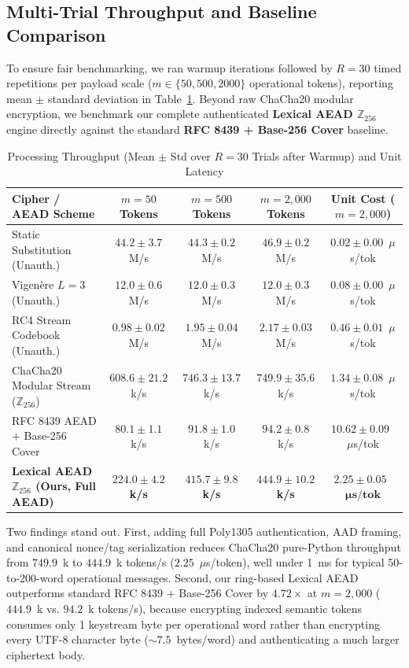 \documentclass[conference]{IEEEtran}
\begin{document}
\subsection{Multi-Trial Throughput and Baseline Comparison}
To ensure fair benchmarking, we ran warmup iterations followed by $R=30$ timed repetitions per payload scale ($m \in \{50, 500, 2000\}$ operational tokens), reporting mean $\pm$ standard deviation in Table~\ref{tab:throughput}. Beyond raw ChaCha20 modular encryption, we benchmark our complete authenticated \textbf{Lexical AEAD $\mathbb{Z}_{256}$} engine directly against the standard \textbf{RFC 8439 + Base-256 Cover} baseline.

\begin{table}[t]
\caption{Processing Throughput (Mean $\pm$ Std over $R = 30$ Trials after Warmup) and Unit Latency}
\label{tab:throughput}
\centering
\begin{tabular}{lcccc}
\toprule
\textbf{Cipher / AEAD Scheme} & \textbf{$m = 50$ Tokens} & \textbf{$m = 500$ Tokens} & \textbf{$m = 2{,}000$ Tokens} & \textbf{Unit Cost ($m=2{,}000$)} \\
\midrule
Static Substitution (Unauth.) & $44.2 \pm 3.7$ M/s & $44.3 \pm 0.2$ M/s & $46.9 \pm 0.2$ M/s & $0.02 \pm 0.00$~$\mu$s/tok \\
Vigen\`ere $L=3$ (Unauth.) & $12.0 \pm 0.6$ M/s & $12.0 \pm 0.3$ M/s & $12.0 \pm 0.3$ M/s & $0.08 \pm 0.00$~$\mu$s/tok \\
RC4 Stream Codebook (Unauth.) & $0.98 \pm 0.02$ M/s & $1.95 \pm 0.04$ M/s & $2.17 \pm 0.03$ M/s & $0.46 \pm 0.01$~$\mu$s/tok \\
ChaCha20 Modular Stream ($\mathbb{Z}_{256}$) & $608.6 \pm 21.2$ k/s & $746.3 \pm 13.7$ k/s & $749.9 \pm 35.6$ k/s & $1.34 \pm 0.08$~$\mu$s/tok \\
\midrule
RFC 8439 AEAD + Base-256 Cover & $80.1 \pm 1.1$ k/s & $91.8 \pm 1.0$ k/s & $94.2 \pm 0.8$ k/s & $10.62 \pm 0.09$~$\mu$s/tok \\
\textbf{Lexical AEAD $\mathbb{Z}_{256}$ (Ours, Full AEAD)} & $\mathbf{224.0 \pm 4.2}$ \textbf{k/s} & $\mathbf{415.7 \pm 9.8}$ \textbf{k/s} & $\mathbf{444.9 \pm 10.2}$ \textbf{k/s} & $\mathbf{2.25 \pm 0.05}$~$\boldsymbol{\mu}\mathbf{s/tok}$ \\
\bottomrule
\end{tabular}
\end{table}

Two findings stand out. First, adding full Poly1305 authentication, AAD framing, and canonical nonce/tag serialization reduces ChaCha20 pure-Python throughput from $749.9$~k to $444.9$~k tokens/s ($2.25$~$\mu$s/token), well under 1~ms for typical 50-to-200-word operational messages. Second, our ring-based Lexical AEAD outperforms standard RFC 8439 + Base-256 Cover by $\mathbf{4.72\times}$ at $m=2{,}000$ ($444.9$~k vs. $94.2$~k tokens/s), because encrypting indexed semantic tokens consumes only 1 keystream byte per operational word rather than encrypting every UTF-8 character byte ($\sim 7.5$~bytes/word) and authenticating a much larger ciphertext body.
\end{document}
